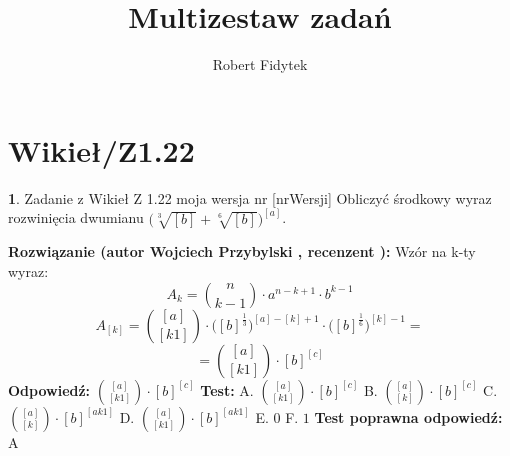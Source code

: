\documentclass[12pt, a4paper]{article}
\title{Multizestaw zadań}
\author{Robert Fidytek}
\date{}
\theoremstyle{definition} %
\newtheorem{zad}{}
\newcommand{\kategoria}[1]{\section{#1}} %
\newcommand{\zadStart}[1]{\begin{zad}#1\newline} %
\newcommand{\zadStop}{\end{zad}}   %
\newcommand{\rozwStart}[2]{\noindent \textbf{Rozwiązanie (autor #1 , recenzent #2): }\newline} %
\newcommand{\rozwStop}{\newline}                                            %
\newcommand{\odpStart}{\noindent \textbf{Odpowiedź:}\newline}    %
\newcommand{\odpStop}{\newline}                                             %
\newcommand{\testStart}{\noindent \textbf{Test:}\newline} %
\newcommand{\testStop}{\newline} %
\newcommand{\kluczStart}{\noindent \textbf{Test poprawna odpowiedź:}\newline} %
\newcommand{\kluczStop}{\newline} %
\begin{document}
\maketitle


\kategoria{Wikieł/Z1.22}
\zadStart{Zadanie z Wikieł Z 1.22  moja wersja nr [nrWersji]}
Obliczyć środkowy wyraz rozwinięcia dwumianu $\bigg(\sqrt[3]{[b]}+\sqrt[6]{[b]}\bigg)^{[a]}$.
\zadStop
\rozwStart{Wojciech Przybylski}{}
Wzór na k-ty wyraz:
$$A_{k}={n\choose k-1}\cdot a^{n-k+1}\cdot b^{k-1}$$
$$A_{[k]}={[a]\choose [k1]}\cdot \big([b]^{\frac{1}{3}}\big)^{[a]-[k]+1}\cdot \big([b]^{\frac{1}{6}}\big)^{[k]-1}=$$
$$={[a]\choose [k1]}\cdot [b]^{[c]}$$
\rozwStop
\odpStart
${[a]\choose [k1]}\cdot [b]^{[c]}$
\odpStop
\testStart
A. ${[a]\choose [k1]}\cdot [b]^{[c]}$
B. ${[a]\choose [k]}\cdot [b]^{[c]}$
C. ${[a]\choose [k]}\cdot [b]^{[ak1]}$
D. ${[a]\choose [k1]}\cdot [b]^{[ak1]}$
E. $0$
F. $1$
\testStop
\kluczStart
A
\kluczStop
\end{document}
